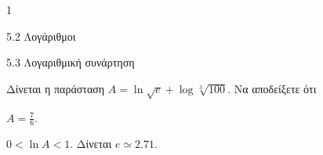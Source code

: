 \begin{ylh}{1}
\item 5.2 Λογάριθμοι
\item 5.3 Λογαριθμική συνάρτηση
\end{ylh}
Δίνεται η παράσταση $A = \ln \sqrt{e} + \log \sqrt[3]{100}$. Να αποδείξετε ότι
\begin{alist}
\item $A = \frac{7}{6}$.
\item $0 < \ln A < 1$.
Δίνεται $e \simeq 2.71$.
\end{alist}

